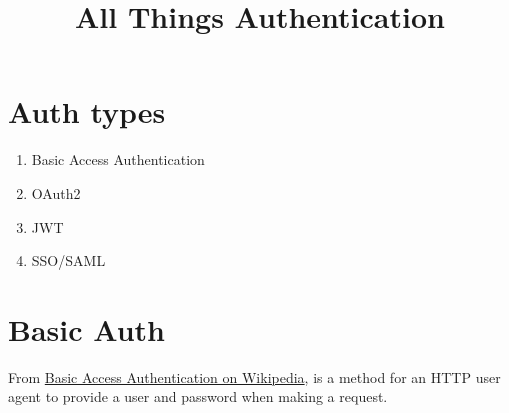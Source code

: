 \documentclass{article}
\title{All Things Authentication}
\begin{document}
\maketitle

\section{Auth types}


\begin{enumerate}
  \item Basic Access Authentication
  \item OAuth2
  \item JWT
  \item SSO/SAML
\end{enumerate}

\section{Basic Auth}

From \href{ihttps://en.wikipedia.org/wiki/Basic_access_authentication}{%
  Basic Access Authentication on Wikipedia}, is a method for an HTTP
user agent to provide a user and password when making a request.
\end{document}
